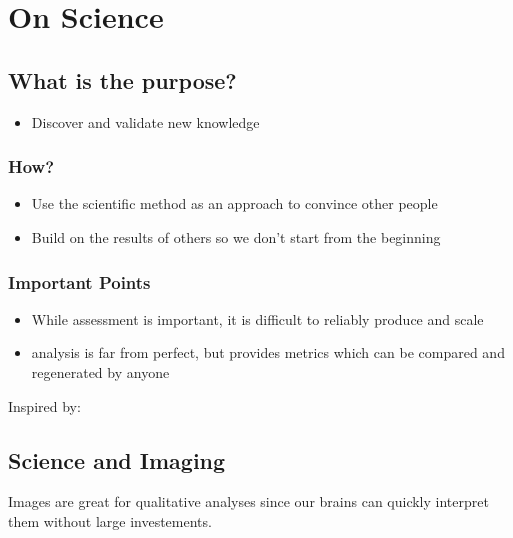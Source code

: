 \documentclass[letterpaper,10pt,english]{sphinxmanual}
\begin{document}
\chapter{On Science}
\label{\detokenize{01-Introduction:on-science}}

\section{What is the purpose?}
\label{\detokenize{01-Introduction:what-is-the-purpose}}\begin{itemize}
\item {} 
\sphinxAtStartPar
Discover and validate new knowledge

\end{itemize}


\subsection{How?}
\label{\detokenize{01-Introduction:how}}\begin{itemize}
\item {} 
\sphinxAtStartPar
Use the scientific method as an approach to convince other people

\item {} 
\sphinxAtStartPar
Build on the results of others so we don’t start from the beginning

\end{itemize}


\subsection{Important Points}
\label{\detokenize{01-Introduction:important-points}}\begin{itemize}
\item {} 
\sphinxAtStartPar
While  assessment is important, it is difficult to reliably produce and scale

\item {} 
\sphinxAtStartPar
{} analysis is far from perfect, but provides metrics which can be compared and regenerated by anyone

\end{itemize}

\sphinxAtStartPar
Inspired by: 


\section{Science and Imaging}
\label{\detokenize{01-Introduction:science-and-imaging}}
\sphinxAtStartPar
Images are great for qualitative analyses since our brains can quickly interpret them without large  investements.
\end{document}
